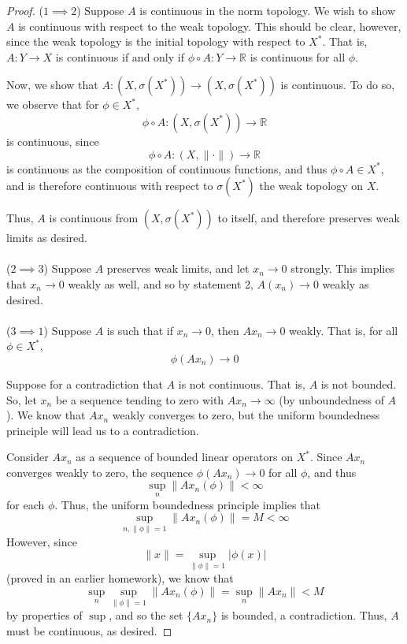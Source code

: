 \documentclass[fontsize=11pt]{scrartcl} %
\numberwithin{equation}{section} %
\numberwithin{figure}{section} %
\numberwithin{table}{section} %
\newcommand{\R}{\mathbb{R}}
\begin{document}
\begin{proof}
    ($1 \implies 2$)
    Suppose $A$ is continuous in the norm topology. We wish to show $A$ is
    continuous with respect to the weak topology. This should be clear, however,
    since the weak topology is the initial topology with respect to $X^*$. That
    is, $A:Y\to X$ is continuous if and only if $\phi\circ A:Y\to \R$ is
    continuous for all $\phi$.

    Now, we show that $A:(X,\sigma(X^*))\to (X,\sigma(X^*))$ is continuous. To
    do so, we observe that for $\phi \in X^*$,
    \[
        \phi\circ A:(X,\sigma(X^*))\to \R
    \]
    is continuous, since
    \[
        \phi\circ A:(X,\|\cdot\|)\to \R
    \]
    is continuous as the composition of continuous functions, and thus
    $\phi\circ A\in X^*$, and is therefore continuous with respect to
    $\sigma(X^*)$ the weak topology on $X$.

    Thus, $A$ is continuous from $(X,\sigma(X^*))$ to itself, and therefore
    preserves weak limits as desired.
    \\
    \\
    ($2\implies 3$)
    Suppose $A$ preserves weak limits, and let $x_n\to 0$ strongly. This implies
    that $x_n\to 0$ weakly as well, and so by statement 2, $A(x_n)\to 0$ weakly
    as desired.
    \\
    \\
    ($3\implies 1$)
    Suppose $A$ is such that if $x_n\to 0$, then $Ax_n\to 0$ weakly. That is,
    for all $\phi\in X^*$,
    \[
        \phi(Ax_n)\to 0
    \]
    
    Suppose for a contradiction that $A$ is not continuous. That is, $A$ is not
    bounded. So, let $x_n$ be a sequence tending to zero with $Ax_n\to\infty$
    (by unboundedness of $A$). We know that $Ax_n$ weakly converges to zero, but
    the uniform boundedness principle will lead us to a contradiction.

    Consider $Ax_n$ as a sequence of bounded linear operators on $X^*$. Since
    $Ax_n$ converges weakly to zero, the sequence $\phi(Ax_n)\to 0$ for all
    $\phi$, and thus 
    \[
        \sup_n\|Ax_n(\phi)\| < \infty
    \]
    for each $\phi$. Thus, the uniform boundedness principle implies that
    \[
        \sup_{n,\|\phi\|=1}\|Ax_n(\phi)\| = M <\infty
    \]
    However, since
    \[
        \|x\| = \sup_{\|\phi\|=1}|\phi(x)|
    \]
    (proved in an earlier homework), we know that
    \[
        \sup_n\sup_{\|\phi\|=1}\|Ax_n(\phi)\| = \sup_n \|Ax_n\|<M
    \]
    by properties of $\sup$, and so the set $\{Ax_n\}$ is bounded, a
    contradiction. Thus, $A$ must be continuous, as desired.
\end{proof}
\end{document}
